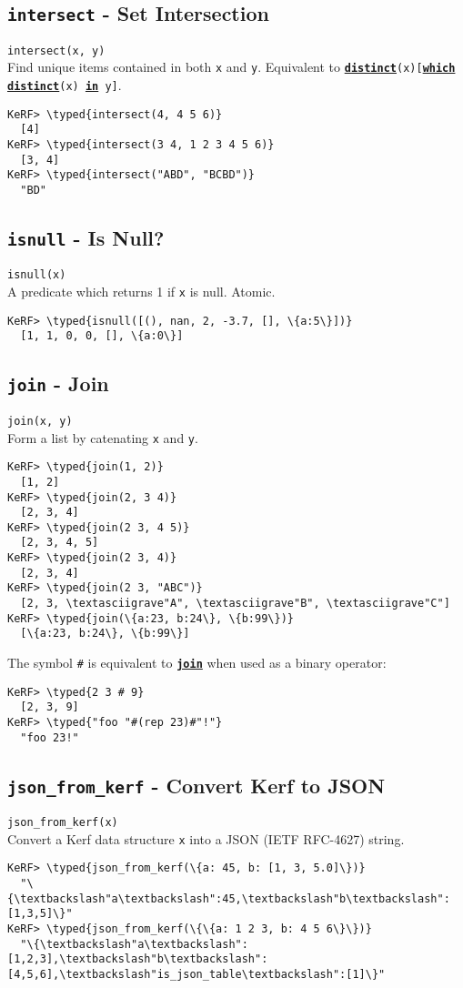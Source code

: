 \documentclass{article}
\newcommand{\typed}[1]{\textcolor{TealBlue}{#1}}
\newcommand{\primdefu}[3]{\subsection{\texttt{#1} - #2}\label{prim:#3}}
\newcommand{\primu}[2]{\hyperref[prim:#2]{\textbf{\texttt{#1}}}}
\newcommand{\primdef}[2]{\primdefu{#1}{#2}{#1}}
\newcommand{\prim}[1]{\primu{#1}{#1}}
\begin{document}
\primdef{intersect}{Set Intersection}
\texttt{intersect(x, y)}\\

Find unique items contained in both \texttt{x} and \texttt{y}. Equivalent to \texttt{\prim{distinct}(x)[\prim{which} \prim{distinct}(x) \prim{in} y]}.
\begin{Verbatim}
KeRF> \typed{intersect(4, 4 5 6)}
  [4]
KeRF> \typed{intersect(3 4, 1 2 3 4 5 6)}
  [3, 4]
KeRF> \typed{intersect("ABD", "BCBD")}
  "BD"
\end{Verbatim}

\primdef{isnull}{Is Null?}
\texttt{isnull(x)}\\

A predicate which returns 1 if \texttt{x} is null. Atomic.
\begin{Verbatim}
KeRF> \typed{isnull([(), nan, 2, -3.7, [], \{a:5\}])}
  [1, 1, 0, 0, [], \{a:0\}]
\end{Verbatim}

\primdef{join}{Join}
\texttt{join(x, y)}\\

Form a list by catenating \texttt{x} and \texttt{y}.
\begin{Verbatim}
KeRF> \typed{join(1, 2)}
  [1, 2]
KeRF> \typed{join(2, 3 4)}
  [2, 3, 4]
KeRF> \typed{join(2 3, 4 5)}
  [2, 3, 4, 5]
KeRF> \typed{join(2 3, 4)}
  [2, 3, 4]
KeRF> \typed{join(2 3, "ABC")}
  [2, 3, \textasciigrave"A", \textasciigrave"B", \textasciigrave"C"]
KeRF> \typed{join(\{a:23, b:24\}, \{b:99\})}
  [\{a:23, b:24\}, \{b:99\}]
\end{Verbatim}

The symbol \texttt{\#} is equivalent to \prim{join} when used as a binary operator:
\begin{Verbatim}
KeRF> \typed{2 3 # 9}
  [2, 3, 9]
KeRF> \typed{"foo "#(rep 23)#"!"}
  "foo 23!"
\end{Verbatim}

\primdefu{json\_from\_kerf}{Convert Kerf to JSON}{jsonFromKerf}
\texttt{json\_from\_kerf(x)}\\

Convert a Kerf data structure \texttt{x} into a JSON (IETF RFC-4627) string.
\begin{Verbatim}
KeRF> \typed{json_from_kerf(\{a: 45, b: [1, 3, 5.0]\})}
  "\{\textbackslash"a\textbackslash":45,\textbackslash"b\textbackslash":[1,3,5]\}"
KeRF> \typed{json_from_kerf(\{\{a: 1 2 3, b: 4 5 6\}\})}
  "\{\textbackslash"a\textbackslash":[1,2,3],\textbackslash"b\textbackslash":[4,5,6],\textbackslash"is_json_table\textbackslash":[1]\}"
\end{Verbatim}
\end{document}
